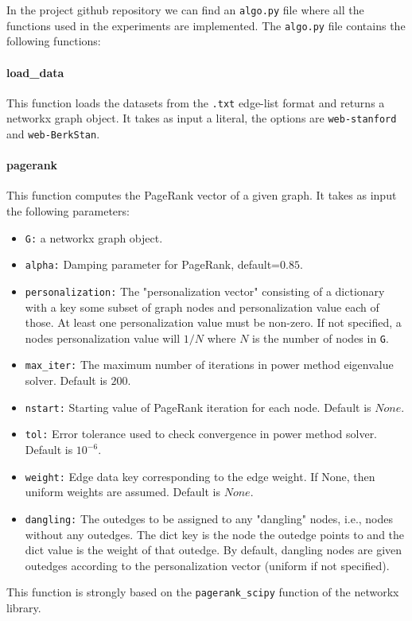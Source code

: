 \noindent In the project github repository  we can find an \texttt{algo.py} file where all the functions used in the experiments are implemented. The \texttt{algo.py} file contains the following functions:

\paragraph{load\_data} This function loads the datasets from the \texttt{.txt} edge-list format and returns a networkx graph object. It takes as input a literal, the options are \texttt{web-stanford} and \texttt{web-BerkStan}.

\paragraph{pagerank} This function computes the PageRank vector of a given graph. It takes as input the following parameters:
    \begin{itemize}
        \item \texttt{G:} a networkx graph object.
        \item \texttt{alpha:} Damping parameter for PageRank, default=$0.85$.
        \item \texttt{personalization:} The "personalization vector" consisting of a dictionary with a key some subset of graph nodes and personalization value each of those. At least one personalization value must be non-zero. If not specified, a nodes personalization value will $1/N$ where $N$ is the number of nodes in \texttt{G}.
        \item \texttt{max\_iter:} The maximum number of iterations in power method eigenvalue solver. Default is $200$.
        \item \texttt{nstart:} Starting value of PageRank iteration for each node. Default is $None$.
        \item \texttt{tol:} Error tolerance used to check convergence in power method solver. Default is $10^{-6}$.
        \item \texttt{weight:} Edge data key corresponding to the edge weight. If None, then uniform weights are assumed. Default is $None$.
        \item \texttt{dangling:} The outedges to be assigned to any "dangling" nodes, i.e., nodes without any outedges. The dict key is the node the outedge points to and the dict value is the weight of that outedge. By default, dangling nodes are given outedges according to the personalization vector (uniform if not specified).
    \end{itemize}
This function is strongly based on the \texttt{pagerank\_scipy} function of the networkx library.

